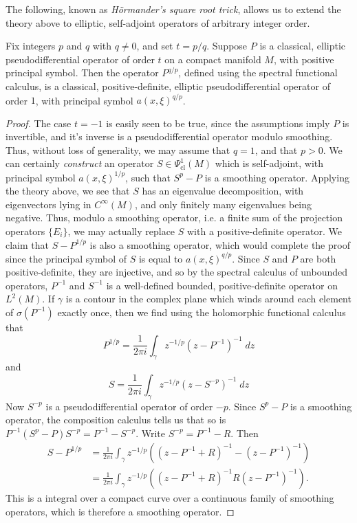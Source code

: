 The following, known as \emph{H\"{o}rmander's square root trick}, allows us to extend the theory above to elliptic, self-adjoint operators of arbitrary integer order.

\begin{theorem}
    Fix integers $p$ and $q$ with $q \neq 0$, and set $t = p/q$. Suppose $P$ is a classical, elliptic pseudodifferential operator of order $t$ on a compact manifold $M$, with positive principal symbol. Then the operator $P^{q/p}$, defined using the spectral functional calculus, is a classical, positive-definite, elliptic pseudodifferential operator of order $1$, with principal symbol $a(x,\xi)^{q/p}$.
\end{theorem}
\begin{proof}
    The case $t = -1$ is easily seen to be true, since the assumptions imply $P$ is invertible, and it's inverse is a pseudodifferential operator modulo smoothing. Thus, without loss of generality, we may assume that $q = 1$, and that $p > 0$. We can certainly \emph{construct} an operator $S \in \Psi^1_{\text{cl}}(M)$ which is self-adjoint, with principal symbol $a(x,\xi)^{1/p}$, such that $S^p - P$ is a smoothing operator. Applying the theory above, we see that $S$ has an eigenvalue decomposition, with eigenvectors lying in $C^\infty(M)$, and only finitely many eigenvalues being negative. Thus, modulo a smoothing operator, i.e. a finite sum of the projection operators $\{ E_i \}$, we may actually replace $S$ with a positive-definite operator. We claim that $S - P^{1/p}$ is also a smoothing operator, which would complete the proof since the principal symbol of $S$ is equal to $a(x,\xi)^{q/p}$. Since $S$ and $P$ are both positive-definite, they are injective, and so by the spectral calculus of unbounded operators, $P^{-1}$ and $S^{-1}$ is a well-defined bounded, positive-definite operator on $L^2(M)$. If $\gamma$ is a contour in the complex plane which winds around each element of $\sigma(P^{-1})$ exactly once, then we find using the holomorphic functional calculus that
    \[ P^{1/p} = \frac{1}{2\pi i} \int_\gamma z^{-1/p} (z - P^{-1})^{-1}\; dz \]
    and
    \[ S = \frac{1}{2 \pi i} \int_\gamma z^{-1/p} (z - S^{-p})^{-1}\; dz \]
    Now $S^{-p}$ is a pseudodifferential operator of order $-p$. Since $S^p - P$ is a smoothing operator, the composition calculus tells us that so is $P^{-1} (S^p - P) S^{-p} = P^{-1} - S^{-p}$. Write $S^{-p} = P^{-1} - R$. Then
    \begin{align*}
        S - P^{1/p} &= \frac{1}{2 \pi i} \int_\gamma z^{-1/p} \left( (z - P^{-1} + R)^{-1} - (z - P^{-1})^{-1} \right)\\
        &= \frac{1}{2 \pi i} \int_\gamma z^{-1/p} \left( (z - P^{-1} + R)^{-1} R (z - P^{-1})^{-1} \right).
    \end{align*}
    This is a integral over a compact curve over a continuous family of smoothing operators, which is therefore a smoothing operator.
\end{proof}

